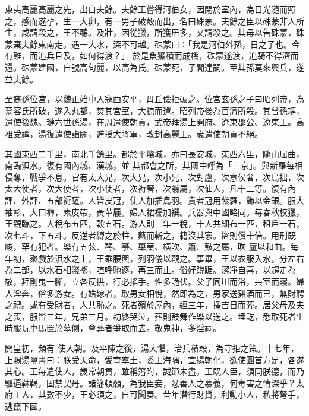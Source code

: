 
\begin{pinyinscope}

 東夷高麗高麗之先，出自夫餘。夫餘王嘗得河伯女，因閉於室內，為日光隨而照之，感而遂孕，生一大卵，有一男子破殼而出，名曰硃蒙。夫餘之臣以硃蒙非人所生，咸請殺之，王不聽。及壯，因從獵，所獲居多，又請殺之。其母以告硃蒙，硃蒙棄夫餘東南走。遇一大水，深不可越。硃蒙曰：「我是河伯外孫，日之子也。今有難，而追兵且及，如何得渡？」
 於是魚鱉積而成橋，硃蒙遂渡，追騎不得濟而還。硃蒙建國，自號高句麗，以高為氏。硃蒙死，子閭達嗣。至其孫莫來興兵，遂並夫餘。



 至裔孫位宮，以魏正始中入寇西安平，毌丘儉拒破之。位宮玄孫之子曰昭列帝，為慕容氏所破，遂入丸都，焚其宮室，大掠而還。昭列帝後為百濟所殺。其曾孫璉，遣使後魏。璉六世孫湯，在周遣使朝貢，武帝拜湯上開府、遼東郡公、遼東王。高祖受禪，湯復遣使詣闕，進授大將軍，改封高麗王。歲遣使朝貢不絕。



 其國東西二千里，南北千餘里。都於平壤城，亦曰長安城，東西六里，隨山屈曲，南臨浿水。復有國內城、漢城，並
 其都會之所，其國中呼為「三京」。與新羅每相侵奪，戰爭不息。官有太大兄，次大兄，次小兄，次對盧，次意侯奢，次烏拙，次太大使者，次大使者，次小使者，次褥奢，次翳屬，次仙人，凡十二等。復有內評、外評、五部褥薩。人皆皮冠，使人加插鳥羽。貴者冠用紫羅，飾以金銀。服大袖衫，大口褲，素皮帶，黃革屨。婦人裙襦加襈。兵器與中國略同。每春秋校獵，王親臨之。人稅布五匹，穀五石。游人則三年一稅，十人共細布一匹，租戶一石，次七斗，下五斗。反逆者縛之於柱，爇而斬之，籍沒其家。盜則償十倍。用刑既峻，罕有犯者。樂有五弦、琴、箏、篳篥、橫吹、簫、鼓之屬，吹
 蘆以和曲。每年初，聚戲於浿水之上，王乘腰輿，列羽儀以觀之。事畢，王以衣服入水，分左右為二部，以水石相濺擲，喧呼馳逐，再三而止。俗好蹲踞。潔凈自喜，以趨走為敬，拜則曳一腳，立各反拱，行必搖手。性多詭伏。父子同川而浴，共室而寢。婦人淫奔，俗多游女。有婚嫁者，取男女相悅，然即為之，男家送豬酒而已，無財聘之禮。或有受財者，人共恥之。死者殯於屋內，經三年，擇吉日而葬。居父母及夫之喪，服皆三年，兄弟三月。初終哭泣，葬則鼓舞作樂以送之。埋訖，悉取死者生時服玩車馬置於墓側，會葬者爭取而去。敬鬼神，多淫祠。



 開皇初，頻有
 使入朝。及平陳之後，湯大懼，治兵積穀，為守拒之策。十七年，上賜湯璽書曰：朕受天命，愛育率土，委王海隅，宣揚朝化，欲使圓首方足，各遂其心。王每遣使人，歲常朝貢，雖稱籓附，誠節未盡。王既人臣，須同朕德，而乃驅逼靺鞨，固禁契丹。諸籓頓顙，為我臣妾，忿善人之慕義，何毒害之情深乎？太府工人，其數不少，王必須之，自可聞奏。昔年潛行財貨，利動小人，私將弩手，逃竄下國。




\end{pinyinscope}
